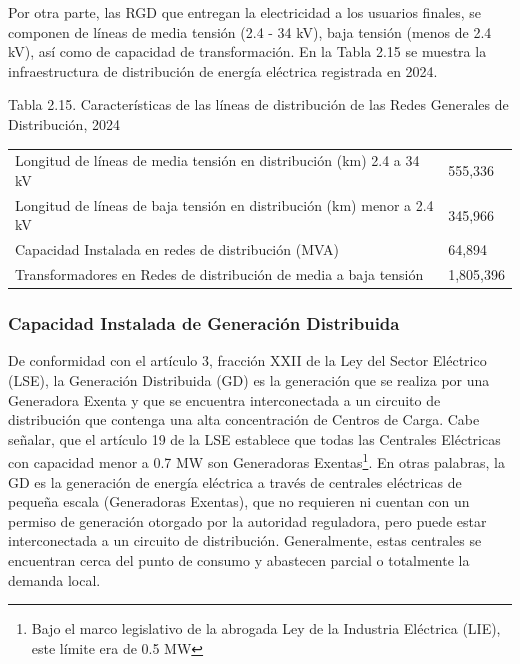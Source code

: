 \documentclass{sener2025}
\begin{document}
Por otra parte, las RGD que entregan la electricidad a los usuarios finales, se componen de líneas de media tensión (2.4 - 34 kV), baja tensión (menos de 2.4 kV), así como de capacidad de transformación. En la Tabla 2.15 se muestra la infraestructura de distribución de energía eléctrica registrada en 2024.

\begin{tabladoradoCorto}
  \caption{Tabla 2.15. Características de las líneas de distribución de las Redes Generales de Distribución, 2024}
  \label{tab:tabla_2_15__caracteristicas_de}
  \begin{tabularx}{\textwidth}{Vv}
    \toprule
      &  \\
    \midrule
    Longitud de líneas de media tensión en distribución (km) 2.4 a 34 kV & 555,336 \\
    Longitud de líneas de baja tensión en distribución (km) menor a 2.4 kV & 345,966 \\
    Capacidad Instalada en redes de distribución (MVA) & 64,894 \\
    Transformadores en Redes de distribución de media a baja tensión & 1,805,396 \\
    \bottomrule
  \end{tabularx}
\end{tabladoradoCorto}
\vspace{-4pt}



\subsubsection{Capacidad Instalada de Generación Distribuida}

De conformidad con el artículo 3, fracción XXII de la Ley del Sector Eléctrico (LSE), la Generación Distribuida (GD) es la generación que se realiza por una Generadora Exenta y que se encuentra interconectada a un circuito de distribución que contenga una alta concentración de Centros de Carga. Cabe señalar, que el artículo 19 de la LSE establece que todas las Centrales Eléctricas con capacidad menor a 0.7 MW son Generadoras Exentas\footnote{Bajo el marco legislativo de la abrogada Ley de la Industria Eléctrica (LIE), este límite era de 0.5 MW}. En otras palabras, la GD es la generación de energía eléctrica a través de centrales eléctricas de pequeña escala (Generadoras Exentas), que no requieren ni cuentan con un permiso de generación otorgado por la autoridad reguladora, pero puede estar interconectada a un circuito de distribución. Generalmente, estas centrales se encuentran cerca del punto de consumo y abastecen parcial o totalmente la demanda local.
\end{document}
